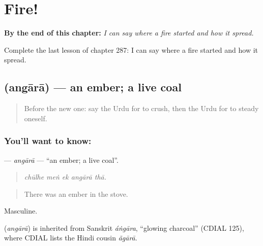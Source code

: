 
\chapter{Fire!}
\label{ch:ur-fire}

\begin{chapteropening}
\textbf{By the end of this chapter:} \emph{I can say where a fire started and how it spread.}

Complete the last lesson of chapter 287: I can say where a fire started and how it spread.
\end{chapteropening}

\section[\texorpdfstring{\ur{انگارا} (angārā)}{انگارا (angārā)}]{ (angārā) — an ember; a live coal}

\label{lesson:UR-C287-angara}



\begin{quote}
Before the new one: say the Urdu for to crush, then the Urdu for to steady oneself.
\end{quote}

\subsection*{You'll want to know: }
\textbf{} — \emph{angārā} — \textquotedblleft{}an ember; a live coal\textquotedblright{}.

\begin{quote}
    
\end{quote}

\begin{quote}
\emph{chūlhe meṅ ek angārā thā.}
\end{quote}

\begin{quote}
There was an ember in the stove.
\end{quote}

Masculine.

\begin{cousinweb}
\textbf{} (\emph{angārā}) is inherited from Sanskrit \emph{áṅgāra}, \textquotedblleft{}glowing charcoal\textquotedblright{} (CDIAL 125), where CDIAL lists the Hindi cousin \emph{ãgārā}.
\end{cousinweb}

